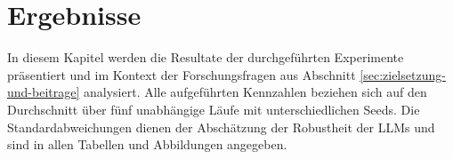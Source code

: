 \chapter{Ergebnisse}\label{ch:ergebnisse}

In diesem Kapitel werden die Resultate der durchgeführten Experimente präsentiert und im Kontext der Forschungsfragen aus Abschnitt \ref{sec:zielsetzung-und-beitrage} analysiert. Alle aufgeführten Kennzahlen beziehen sich auf den Durchschnitt über fünf unabhängige Läufe mit unterschiedlichen Seeds. Die Standardabweichungen dienen der Abschätzung der Robustheit der \acp{LLM} und sind in allen Tabellen und Abbildungen angegeben.







